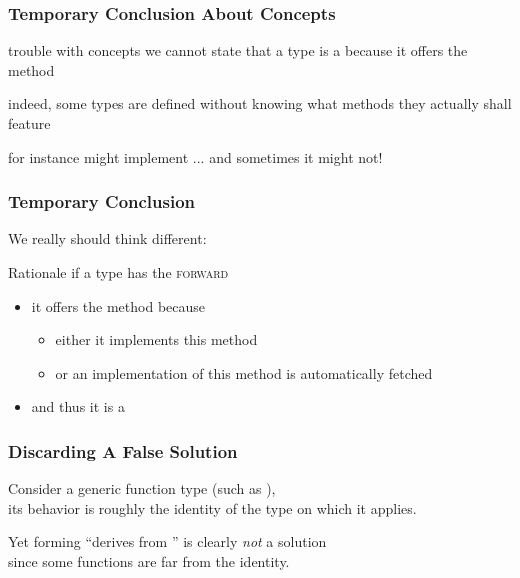 \begin{frame}
  \frametitle{Temporary Conclusion About Concepts}


\begin{block}{trouble with concepts}
  we cannot state that a type is a \bfForwardIterator because it
  offers the method \bfnext
\end{block}

\bigskip
\bigskip

indeed, some types are defined without knowing what methods they
actually shall feature

\bigskip

{\scriptsize for instance \bfreverseI might implement \bfnext... and
  sometimes it might not! }


\end{frame}





\begin{frame}
  \frametitle{Temporary Conclusion}


We really should think different:

\bigskip

\begin{block}{Rationale}
  if a type has the \textsc{forward} \textit{{\color{red}{property}}}
  \begin{itemize}
  \item it offers the method \bfnext because
      \begin{itemize}
        \item either it implements this method
        \item or an implementation of this method is automatically fetched
      \end{itemize}
  \item and thus it is a \bfForwardIterator
  \end{itemize} 
\end{block}

\end{frame}



\begin{frame}
  \frametitle{Discarding A False Solution}

Consider a generic function type \bff (such as \bfreverse), \\ its behavior
is roughly the identity of the type on which it applies.

\bigskip

Yet forming ``\bffT derives from \bfT'' is clearly \textit{not} a
solution \\ since some functions \bff are far from the identity.


\end{frame}



